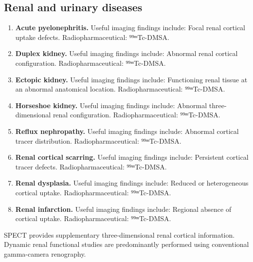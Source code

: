 \subsection{Renal and urinary diseases}
\begin{enumerate}[leftmargin=*,itemsep=0.45em,topsep=0.4em]
\item \textbf{Acute pyelonephritis.} Useful imaging findings include: Focal renal cortical uptake defects. Radiopharmaceutical: ⁹⁹ᵐTc-DMSA.
\item \textbf{Duplex kidney.} Useful imaging findings include: Abnormal renal cortical configuration. Radiopharmaceutical: ⁹⁹ᵐTc-DMSA.
\item \textbf{Ectopic kidney.} Useful imaging findings include: Functioning renal tissue at an abnormal anatomical location. Radiopharmaceutical: ⁹⁹ᵐTc-DMSA.
\item \textbf{Horseshoe kidney.} Useful imaging findings include: Abnormal three-dimensional renal configuration. Radiopharmaceutical: ⁹⁹ᵐTc-DMSA.
\item \textbf{Reflux nephropathy.} Useful imaging findings include: Abnormal cortical tracer distribution. Radiopharmaceutical: ⁹⁹ᵐTc-DMSA.
\item \textbf{Renal cortical scarring.} Useful imaging findings include: Persistent cortical tracer defects. Radiopharmaceutical: ⁹⁹ᵐTc-DMSA.
\item \textbf{Renal dysplasia.} Useful imaging findings include: Reduced or heterogeneous cortical uptake. Radiopharmaceutical: ⁹⁹ᵐTc-DMSA.
\item \textbf{Renal infarction.} Useful imaging findings include: Regional absence of cortical uptake. Radiopharmaceutical: ⁹⁹ᵐTc-DMSA.
\end{enumerate}
SPECT provides supplementary three-dimensional renal cortical information. Dynamic renal functional studies are predominantly performed using conventional gamma-camera renography.


